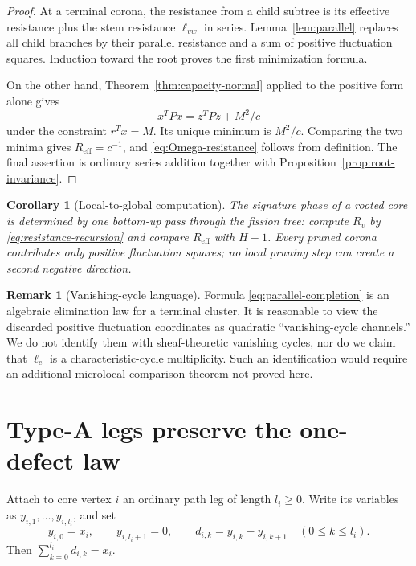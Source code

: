 \documentclass[11pt,a4paper]{amsart}
\theoremstyle{plain}
\newtheorem{corollary}[theorem]{Corollary}
\theoremstyle{definition}
\newtheorem{remark}[theorem]{Remark}
\begin{document}
\begin{proof}
At a terminal corona, the resistance from a child subtree is its effective resistance plus the
stem resistance $\ell_{vw}$ in series.  Lemma~\ref{lem:parallel} replaces all child branches by
their parallel resistance and a sum of positive fluctuation squares.  Induction toward the root
proves the first minimization formula.

On the other hand, Theorem~\ref{thm:capacity-normal} applied to the positive form alone gives
\[
 x^TPx=z^TPz+M^2/c
\]
under the constraint $r^Tx=M$.  Its unique minimum is $M^2/c$.  Comparing the two minima gives
$R_{\mathrm{eff}}=c^{-1}$, and \eqref{eq:Omega-resistance} follows from definition.
The final assertion is ordinary series addition together with
Proposition~\ref{prop:root-invariance}.
\end{proof}

\begin{corollary}[Local-to-global computation]\label{cor:message-passing}
The signature phase of a rooted core is determined by one bottom-up pass through the fission tree:
compute $R_v$ by \eqref{eq:resistance-recursion} and compare $R_{\mathrm{eff}}$ with $H-1$.
Every pruned corona contributes only positive fluctuation squares; no local pruning step can create
a second negative direction.
\end{corollary}

\begin{remark}[Vanishing-cycle language]
Formula \eqref{eq:parallel-completion} is an algebraic elimination law for a terminal cluster.  It
is reasonable to view the discarded positive fluctuation coordinates as quadratic
``vanishing-cycle channels.''  We do not identify them with sheaf-theoretic vanishing cycles, nor
do we claim that $\ell_e$ is a characteristic-cycle multiplicity.  Such an identification would
require an additional microlocal comparison theorem not proved here.
\end{remark}

\section{Type-A legs preserve the one-defect law}\label{sec:legs}

Attach to core vertex $i$ an ordinary path leg of length $l_i\ge0$.  Write its variables as
$y_{i,1},\dots,y_{i,l_i}$, and set
\[
 y_{i,0}=x_i,\qquad y_{i,l_i+1}=0,\qquad
 d_{i,k}=y_{i,k}-y_{i,k+1}\quad(0\le k\le l_i).
\]
Then $\sum_{k=0}^{l_i}d_{i,k}=x_i$.
\end{document}
